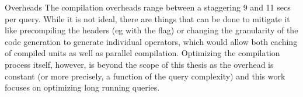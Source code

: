 \begin{corrected}{Overheads}
  The compilation overheads range between a staggering 9 and 11 secs
  per query. While it is not ideal, there are things that can be done
  to mitigate it like precompiling the headers (eg with the
   flag) or changing the granularity of the code
  generation to generate individual operators, which would allow both
  caching of compiled units as well as parallel
  compilation. Optimizing the compilation process itself, however, is
  beyond the scope of this thesis as the overhead is constant (or more
  precisely, a function of the query complexity) and this work focuses
  on optimizing long running queries.
\end{corrected}

